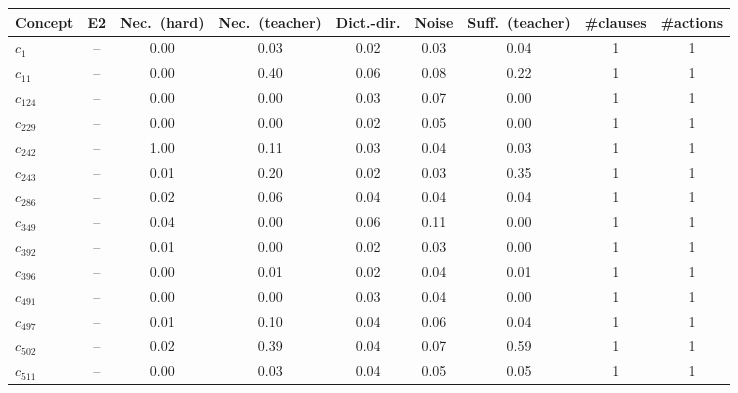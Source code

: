 \begin{tabular}{lcccccccc}
\toprule
Concept & E2 & Nec.\ (hard) & Nec.\ (teacher) & Dict.-dir. & Noise & Suff.\ (teacher) & \#clauses & \#actions \\
\midrule
$c_{1}$ & -- & 0.00 & 0.03 & 0.02 & 0.03 & 0.04 & 1 & 1 \\
$c_{11}$ & -- & 0.00 & 0.40 & 0.06 & 0.08 & 0.22 & 1 & 1 \\
$c_{124}$ & -- & 0.00 & 0.00 & 0.03 & 0.07 & 0.00 & 1 & 1 \\
$c_{229}$ & -- & 0.00 & 0.00 & 0.02 & 0.05 & 0.00 & 1 & 1 \\
$c_{242}$ & -- & 1.00 & 0.11 & 0.03 & 0.04 & 0.03 & 1 & 1 \\
$c_{243}$ & -- & 0.01 & 0.20 & 0.02 & 0.03 & 0.35 & 1 & 1 \\
$c_{286}$ & -- & 0.02 & 0.06 & 0.04 & 0.04 & 0.04 & 1 & 1 \\
$c_{349}$ & -- & 0.04 & 0.00 & 0.06 & 0.11 & 0.00 & 1 & 1 \\
$c_{392}$ & -- & 0.01 & 0.00 & 0.02 & 0.03 & 0.00 & 1 & 1 \\
$c_{396}$ & -- & 0.00 & 0.01 & 0.02 & 0.04 & 0.01 & 1 & 1 \\
$c_{491}$ & -- & 0.00 & 0.00 & 0.03 & 0.04 & 0.00 & 1 & 1 \\
$c_{497}$ & -- & 0.01 & 0.10 & 0.04 & 0.06 & 0.04 & 1 & 1 \\
$c_{502}$ & -- & 0.02 & 0.39 & 0.04 & 0.07 & 0.59 & 1 & 1 \\
$c_{511}$ & -- & 0.00 & 0.03 & 0.04 & 0.05 & 0.05 & 1 & 1 \\
\bottomrule
\end{tabular}